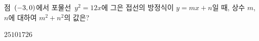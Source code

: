 점~$(-3{,}\mkern3mu\mathopen{}0)$에서 포물선~$y^2=12x$에 그은 접선의 방정식이 $y=mx+n$일 때, 상수 $m$, $n$에 대하여 $m^2+n^2$의 값은?
\begin{choices32}{$2$}{$5$}{$10$}{$17$}{$26$}\end{choices32}
